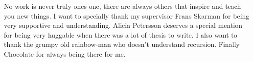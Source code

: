 No work is never truly ones one, there are always others that inspire and teach you new things. I want to specially thank my supervisor Frans Skarman for being very supportive and understanding. Alicia Petersson deserves a special mention for being very huggable when there was a lot of thesis to write. I also want to thank the grumpy old rainbow-man who doesn't understand recursion. Finally Chocolate for always being there for me.
